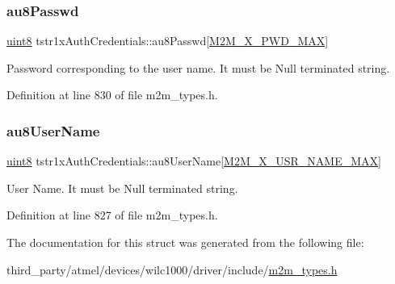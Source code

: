 \subsubsection{\texorpdfstring{au8\+Passwd}{au8Passwd}}
{\footnotesize\ttfamily \hyperlink{group__DataT_ga4df709a77647e870bbf1d955b8edc9a6}{uint8} tstr1x\+Auth\+Credentials\+::au8\+Passwd\mbox{[}\hyperlink{group__WlanDefines_ga55139884349304f2d747ec28e157368b}{M2\+M\+\_\+X\+\_\+\+P\+W\+D\+\_\+\+M\+AX}\mbox{]}}

Password corresponding to the user name. It must be Null terminated string. 

Definition at line 830 of file m2m\+\_\+types.\+h.

\mbox{\label{structtstr1xAuthCredentials_abe35d19d3503d63da7da8798b2e486e8}} 
\subsubsection{\texorpdfstring{au8\+User\+Name}{au8UserName}}
{\footnotesize\ttfamily \hyperlink{group__DataT_ga4df709a77647e870bbf1d955b8edc9a6}{uint8} tstr1x\+Auth\+Credentials\+::au8\+User\+Name\mbox{[}\hyperlink{group__WlanDefines_ga0a22970c1dd8d0cb58c5c1b35217618d}{M2\+M\+\_\+X\+\_\+\+U\+S\+R\+\_\+\+N\+A\+M\+E\+\_\+\+M\+AX}\mbox{]}}

User Name. It must be Null terminated string. 

Definition at line 827 of file m2m\+\_\+types.\+h.



The documentation for this struct was generated from the following file\+:\begin{DoxyCompactItemize}
\item 
third\+\_\+party/atmel/devices/wilc1000/driver/include/\hyperlink{m2m__types_8h}{m2m\+\_\+types.\+h}\end{DoxyCompactItemize}
